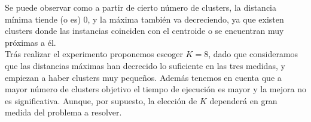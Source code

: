 \documentclass[11pt,a4paper]{article}
\begin{document}
\begin{figure}[h]
\end{figure}


Se puede observar como a partir de cierto número de clusters, la distancia
mínima tiende (o es) 0, y la máxima también va decreciendo, ya que existen
clusters donde las instancias coinciden con el centroide o se
encuentran muy próximas a él. \\

Trás realizar el experimento proponemos escoger $K = 8$, dado que
consideramos que las distancias máximas han decrecido lo suficiente en las
tres medidas, y empiezan a haber clusters muy pequeños. Además tenemos en
cuenta que a mayor número de clusters objetivo el tiempo de ejecución es
mayor y la mejora no es significativa. Aunque, por supuesto, la elección de
$K$ dependerá en gran medida del problema a resolver.
\end{document}
